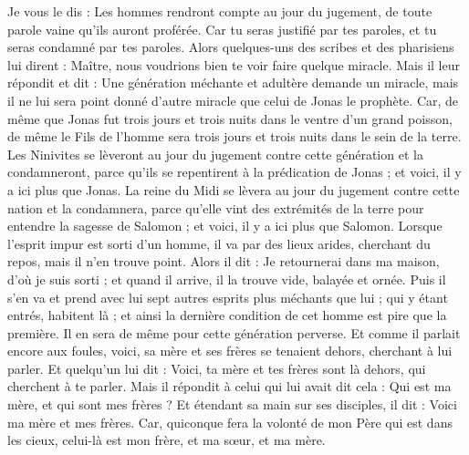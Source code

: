 \begin{multicols}{2}
Je vous le dis : Les hommes rendront compte au jour du jugement, de toute parole vaine qu'ils auront proférée.
Car tu seras justifié par tes paroles, et tu seras condamné par tes paroles.
Alors quelques-uns des scribes et des pharisiens lui dirent : Maître, nous voudrions bien te voir faire quelque miracle.
Mais il leur répondit et dit : Une génération méchante et adultère demande un miracle, mais il ne lui sera point donné d'autre miracle que celui de Jonas le prophète.
Car, de même que Jonas fut trois jours et trois nuits dans le ventre d'un grand poisson, de même le Fils de l'homme sera trois jours et trois nuits dans le sein de la terre.
Les Ninivites se lèveront au jour du jugement contre cette génération et la condamneront, parce qu'ils se repentirent à la prédication de Jonas ; et voici, il y a ici plus que Jonas.
La reine du Midi se lèvera au jour du jugement contre cette nation et la condamnera, parce qu'elle vint des extrémités de la terre pour entendre la sagesse de Salomon ; et voici, il y a ici plus que Salomon.
Lorsque l'esprit impur est sorti d'un homme, il va par des lieux arides, cherchant du repos, mais il n'en trouve point.
Alors il dit : Je retournerai dans ma maison, d'où je suis sorti ; et quand il arrive, il la trouve vide, balayée et ornée.
Puis il s'en va et prend avec lui sept autres esprits plus méchants que lui ; qui y étant entrés, habitent là ; et ainsi la dernière condition de cet homme est pire que la première. Il en sera de même pour cette génération perverse.
Et comme il parlait encore aux foules, voici, sa mère et ses frères se tenaient dehors, cherchant à lui parler.
Et quelqu'un lui dit : Voici, ta mère et tes frères sont là dehors, qui cherchent à te parler.
Mais il répondit à celui qui lui avait dit cela : Qui est ma mère, et qui sont mes frères ?
Et étendant sa main sur ses disciples, il dit : Voici ma mère et mes frères.
Car, quiconque fera la volonté de mon Père qui est dans les cieux, celui-là est mon frère, et ma sœur, et ma mère.

\end{multicols}
